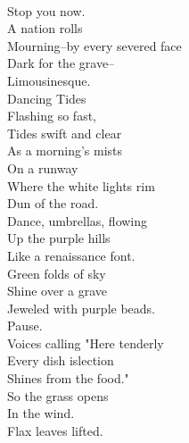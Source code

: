 \documentclass[smalldemyvopaper,11pt,twoside,onecolumn,openright,extrafontsizes]{memoir}
\begin{document}
\\Stop you now.
\\A nation rolls
\\Mourning--by every severed face
\\Dark for the grave--
\\Limousinesque.
\\Dancing Tides
\\Flashing so fast,
\\Tides swift and clear
\\As a morning's mists
\\On a runway
\\Where the white lights rim
\\Dun of the road.
\\Dance, umbrellas, flowing
\\Up the purple hills
\\Like a renaissance font.
\\Green folds of sky
\\Shine over a grave
\\Jeweled with purple beads.
\\Pause.
\\Voices calling "Here tenderly
\\Every dish islection
\\Shines from the food."
\\So the grass opens
\\In the wind.
\\Flax leaves lifted.
\end{document}
